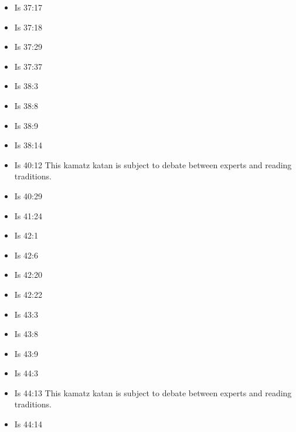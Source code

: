 \documentclass[14pt]{article}
\begin{document}
\begin{multicols}{2}
\begin{itemize}
		\item Is 37:17
		
		\item Is 37:18
		
		\item Is 37:29
		
		\item Is 37:37
		
		\item Is 38:3
		
		\item Is 38:8
		
		\item Is 38:9
		
		\item Is 38:14
		
		\item Is 40:12 This kamatz katan is subject to debate between experts and reading traditions.
		
		\item Is 40:29
		
		\item Is 41:24
		
		\item Is 42:1
		
		\item Is 42:6
		
		\item Is 42:20
		
		\item Is 42:22
		
		\item Is 43:3
		
		\item Is 43:8
		
		\item Is 43:9
		
		\item Is 44:3
		
		\item Is 44:13 This kamatz katan is subject to debate between experts and reading traditions.
		
		\item Is 44:14
		

\end{itemize}
\end{multicols}
\end{document}
